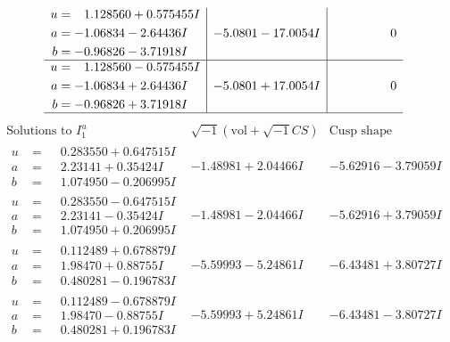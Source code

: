 \documentclass[1p]{elsarticle_modified}
\theoremstyle{definition}
\newcommand{\I}{\sqrt{-1}}
\begin{document}
$$\begin{array}{c|c|c}
\begin{aligned}
u &= \phantom{-}1.128560 + 0.575455 I \\
a &= -1.06834 - 2.64436 I \\
b &= -0.96826 - 3.71918 I\end{aligned}
 & -5.0801 - 17.0054 I & \phantom{-0.000000 } 0 \\ \hline\begin{aligned}
u &= \phantom{-}1.128560 - 0.575455 I \\
a &= -1.06834 + 2.64436 I \\
b &= -0.96826 + 3.71918 I\end{aligned}
 & -5.0801 + 17.0054 I & \phantom{-0.000000 } 0\\
 \hline 
 \end{array}$$\newpage$$\begin{array}{c|c|c}  
\text{Solutions to }I^u_{1}& \I (\text{vol} + \sqrt{-1}CS) & \text{Cusp shape}\\
 \hline 
\begin{aligned}
u &= \phantom{-}0.283550 + 0.647515 I \\
a &= \phantom{-}2.23141 + 0.35424 I \\
b &= \phantom{-}1.074950 - 0.206995 I\end{aligned}
 & -1.48981 + 2.04466 I & -5.62916 - 3.79059 I \\ \hline\begin{aligned}
u &= \phantom{-}0.283550 - 0.647515 I \\
a &= \phantom{-}2.23141 - 0.35424 I \\
b &= \phantom{-}1.074950 + 0.206995 I\end{aligned}
 & -1.48981 - 2.04466 I & -5.62916 + 3.79059 I \\ \hline\begin{aligned}
u &= \phantom{-}0.112489 + 0.678879 I \\
a &= \phantom{-}1.98470 + 0.88755 I \\
b &= \phantom{-}0.480281 - 0.196783 I\end{aligned}
 & -5.59993 - 5.24861 I & -6.43481 + 3.80727 I \\ \hline\begin{aligned}
u &= \phantom{-}0.112489 - 0.678879 I \\
a &= \phantom{-}1.98470 - 0.88755 I \\
b &= \phantom{-}0.480281 + 0.196783 I\end{aligned}
 & -5.59993 + 5.24861 I & -6.43481 - 3.80727 I \\ \hline\begin{aligned}

\end{aligned}
\end{array}$$
\end{document}
